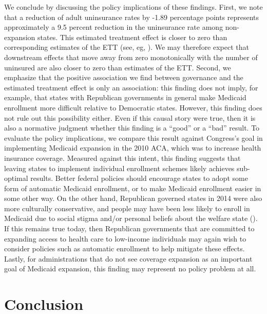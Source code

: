 \documentclass[12pt]{article}
\begin{document}
We conclude by discussing the policy implications of these findings. First, we note that a reduction of adult uninsurance rates by -1.89 percentage points represents approximately a 9.5 percent reduction in the uninsurance rate among non-expansion states. This estimated treatment effect is closer to zero than corresponding estimates of the ETT (see, eg, \cite{courtemanche2017early}). We may therefore expect that downstream effects that move away from zero monotonically with the number of uninsured are also closer to zero than estimates of the ETT. Second, we emphasize that the positive association we find between governance and the estimated treatment effect is only an association: this finding does not imply, for example, that states with Republican governments in general make Medicaid enrollment more difficult relative to Democratic states. However, this finding does not rule out this possibility either. Even if this causal story were true, then it is also a normative judgment whether this finding is a ``good'' or a ``bad'' result. To evaluate the policy implications, we compare this result against Congress's goal in implementing Medicaid expansion in the 2010 ACA, which was to increase health insurance coverage. Measured against this intent, this finding suggests that leaving states to implement individual enrollment schemes likely achieves sub-optimal results. Better federal policies should encourage states to adopt some form of automatic Medicaid enrollment, or to make Medicaid enrollment easier in some other way. On the other hand, Republican governed states in 2014 were also more culturally conservative, and people may have been less likely to enroll in Medicaid due to social stigma and/or personal beliefs about the welfare state (\cite{sommers2012understanding}). If this remains true today, then Republican governments that are committed to expanding access to health care to low-income individuals may again wish to consider policies such as automatic enrollment to help mitigate these effects. Lastly, for administrations that do not see coverage expansion as an important goal of Medicaid expansion, this finding may represent no policy problem at all.

\section{Conclusion}
\end{document}
